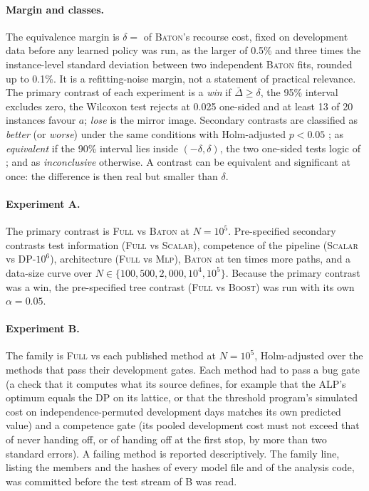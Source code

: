 \documentclass[trsc,dblanonrev]{informs4}
\newcommand{\Full}{\textsc{Full}}
\newcommand{\Scalar}{\textsc{Scalar}}
\newcommand{\Mlp}{\textsc{Mlp}}
\newcommand{\Boost}{\textsc{Boost}}
\newcommand{\Baton}{\textsc{Baton}}
\begin{document}
\paragraph{Margin and classes.} The equivalence margin is
$\delta = $ \Margin{} of \Baton{}'s recourse cost, fixed on development data
before any learned policy was run, as the larger of 0.5\% and three times the
instance-level standard deviation between two independent \Baton{} fits,
rounded up to 0.1\%. It is a refitting-noise margin, not a statement of
practical relevance. The primary contrast of each experiment is a \emph{win}
if $\bar\Delta \ge \delta$, the 95\% interval excludes zero, the Wilcoxon test
rejects at 0.025 one-sided and at least 13 of 20 instances favour $a$;
\emph{lose} is the mirror image. Secondary contrasts are classified as
\emph{better} (or \emph{worse}) under the same conditions with Holm-adjusted
$p < 0.05$ \citep{holm1979simple}; as \emph{equivalent} if the 90\% interval
lies inside $(-\delta, \delta)$, the two one-sided tests logic of
\citet{schuirmann1987comparison}; and as \emph{inconclusive} otherwise.
A contrast can be equivalent and significant at once: the difference is then
real but smaller than $\delta$.

\paragraph{Experiment A.} The primary contrast is \Full{} vs \Baton{} at
$N = 10^5$. Pre-specified secondary contrasts test information (\Full{} vs
\Scalar{}), competence of the pipeline (\Scalar{} vs DP-$10^6$), architecture
(\Full{} vs \Mlp{}), \Baton{} at ten times more paths, and a data-size curve
over $N \in \{100, 500, 2{,}000, 10^4, 10^5\}$. Because the primary contrast
was a win, the pre-specified tree contrast (\Full{} vs \Boost{}) was run with
its own $\alpha = 0.05$.

\paragraph{Experiment B.} The family is \Full{} vs each published method at
$N = 10^5$, Holm-adjusted over the methods that pass their development gates.
Each method had to pass a bug gate (a check that it computes what its source
defines, for example that the ALP's optimum equals the DP on its lattice, or
that the threshold program's simulated cost on independence-permuted
development days matches its own predicted value) and a competence gate (its
pooled development cost must not exceed that of never handing off, or of
handing off at the first stop, by more than two standard errors). A failing
method is reported descriptively. The family line, listing the members and
the hashes of every model file and of the analysis code, was committed before
the test stream of B was read.
\end{document}
